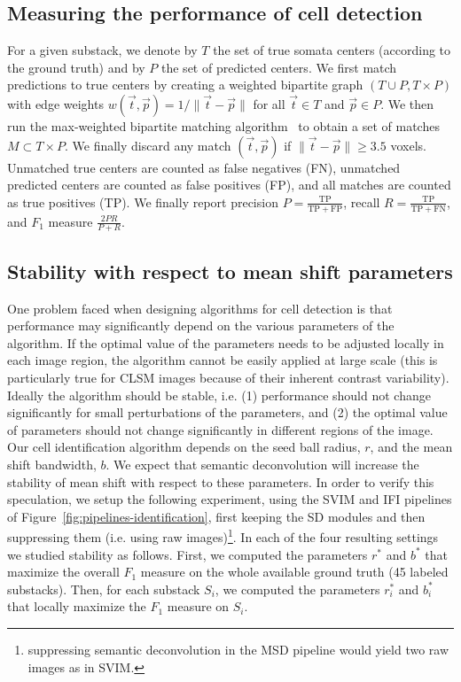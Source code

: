 \documentclass[smallextended]{svjour3}       %
\begin{document}
\subsection{Measuring the performance of cell detection}
\label{sec:performance-evaluation}

For a given substack, we denote by $T$ the set of true somata centers
(according to the ground truth) and by $P$ the set of predicted
centers. We first match predictions to true centers by creating a
weighted bipartite graph $(T\cup P, T\times P)$ with edge weights
$w(\vec{t},\vec{p}) = 1/\|\vec{t}-\vec{p}\|$ for all $\vec{t}\in T$ and $\vec{p}\in P$. We
then run the max-weighted bipartite matching
algorithm~\cite{galil_efficient_1986} to obtain a set of matches
$M\subset T\times P$. We finally discard any match $(\vec{t},\vec{p})$ if
$\|\vec{t}-\vec{p}\|\geq 3.5$ voxels.
Unmatched true centers are counted as false negatives (FN), unmatched
predicted centers are counted as false positives (FP), and all matches
are counted as true positives (TP). We finally report precision
$P=\frac{\mathrm{TP}}{\mathrm{TP}+\mathrm{FP}}$, recall
$R=\frac{\mathrm{TP}}{\mathrm{TP}+\mathrm{FN}}$, and $F_1$ measure
$\frac{2PR}{P+R}$.


\subsection{Stability with respect to mean shift parameters}
\label{sec:stability}
One problem faced when designing algorithms for cell detection is that
performance may significantly depend on the various parameters of the
algorithm. If the optimal value of the parameters needs to be adjusted
locally in each image region, the algorithm cannot be easily applied at
large scale (this is particularly true for CLSM images because of
their inherent contrast variability). Ideally the algorithm should be
stable, i.e. (1) performance should not change significantly for small
perturbations of the parameters, and (2) the optimal value of
parameters should not change significantly in different regions of the
image.  Our cell identification algorithm depends on the seed ball
radius, $r$, and the mean shift bandwidth, $b$. We expect that
semantic deconvolution will increase the stability of mean shift with
respect to these parameters. In order to verify this speculation, we
setup the following experiment, using the SVIM and IFI pipelines of
Figure~\ref{fig:pipelines-identification}, first keeping the SD
modules and then suppressing them (i.e. using raw
images)\footnote{suppressing semantic deconvolution in the MSD
  pipeline would yield two raw images as in SVIM.}. In each of the four resulting
settings we studied stability as follows.  First, we computed the
parameters $r^*$ and $b^*$ that maximize the overall $F_1$ measure on
the whole available ground truth (45 labeled substacks). Then, for
each substack $S_i$, we computed the parameters $r^*_i$ and $b^*_i$
that locally maximize the $F_1$ measure on $S_i$.
\end{document}
